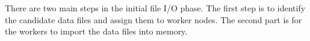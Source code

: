 There are two main steps in the initial file I/O phase. The first step is to identify the candidate data files and assign them to worker nodes. The second part is for the workers to import the data files into memory.